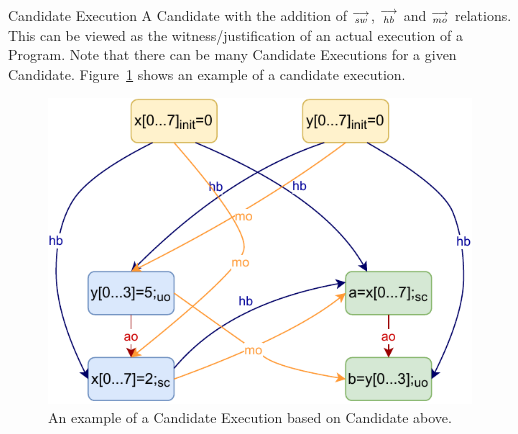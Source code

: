     \begin{definition}{Candidate Execution}
        A Candidate with the addition of $\stackrel{\longrightarrow}{_\textit{sw}}$, $\stackrel{\longrightarrow}{_\textit{hb}}$ and $\stackrel{\longrightarrow}{_\textit{mo}}$ relations. This can be viewed as the witness/justification of an actual execution of a Program. Note that there can be many Candidate Executions for a given Candidate. Figure~\ref{model:candexec} shows an example of a candidate execution. 
        
        \begin{figure}[H]
            \centering
            \includegraphics[scale=0.7]{4.ECMAScriptMemoryModel/CandidateExecution.pdf}
            \caption{An example of a Candidate Execution based on Candidate above.}
            \label{model:candexec}
        \end{figure}
        
    \end{definition}

